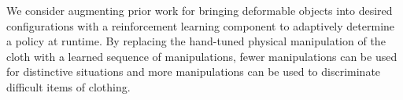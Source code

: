 We consider augmenting prior work for bringing deformable objects into
desired configurations with a reinforcement learning component to
adaptively determine a policy at runtime. By replacing the hand-tuned
physical manipulation of the cloth with a learned sequence of
manipulations, fewer manipulations can be used for distinctive
situations and more manipulations can be used to discriminate
difficult items of clothing.
